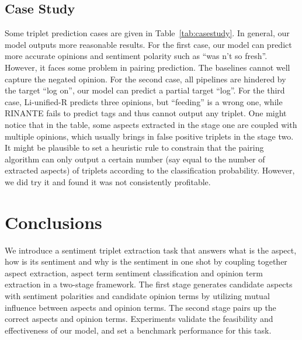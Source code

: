\documentclass[letterpaper]{article} \usepackage{aaai20}  \usepackage{times}  \usepackage{helvet} \usepackage{courier}  \usepackage[hyphens]{url}  \usepackage{graphicx} \urlstyle{rm} \def\UrlFont{\rm}  \usepackage{graphicx}  \frenchspacing  \setlength{\pdfpagewidth}{8.5in}  \setlength{\pdfpageheight}{11in}
\begin{document}
\subsection{Case Study}
Some triplet prediction cases are given in Table~\ref{tab:casestudy}. In general, our model outputs more reasonable results. For the first case, our model can predict more accurate opinions and sentiment polarity such as ``was n't so fresh''. However, it faces some problem in pairing prediction. The baselines cannot well capture the negated opinion. For the second case, all pipelines are hindered by the target ``log on'', our model can predict a partial target ``log''. For the third case, Li-unified-R predicts three opinions, but ``feeding'' is a wrong one, while RINANTE fails to predict tags and thus cannot output any triplet. 
One might notice that in the table, some aspects extracted in the stage one are coupled with multiple opinions, which usually brings in false positive triplets in the stage two. It might be plausible to set a heuristic rule to constrain that the pairing algorithm can only output a certain number (say equal to the number of extracted aspects) of triplets according to the classification probability. However, we did try it and found it was not consistently profitable. 

\section{Conclusions}\label{sec:conclusion}
We introduce a sentiment triplet extraction task that answers what is the aspect, how is its sentiment and why is the sentiment in one shot by coupling together aspect extraction, aspect term sentiment classification and opinion term extraction in a two-stage framework. The first stage generates candidate aspects with sentiment polarities and candidate opinion terms by utilizing mutual influence between aspects and opinion terms. The second stage pairs up the correct aspects and opinion terms. Experiments validate the feasibility and effectiveness of our model, and set a benchmark performance for this task. 

\begin{small}



\end{small}
\end{document}
